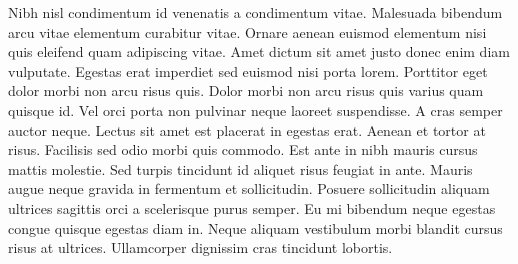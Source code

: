 \documentclass[portuguese, 11pt, a4paper, titlepage, oneside]{article}
\begin{document}
Nibh nisl condimentum id venenatis a condimentum vitae. Malesuada bibendum arcu vitae elementum curabitur vitae. Ornare aenean euismod elementum nisi quis eleifend quam adipiscing vitae. Amet dictum sit amet justo donec enim diam vulputate. Egestas erat imperdiet sed euismod nisi porta lorem. Porttitor eget dolor morbi non arcu risus quis. Dolor morbi non arcu risus quis varius quam quisque id. Vel orci porta non pulvinar neque laoreet suspendisse. A cras semper auctor neque. Lectus sit amet est placerat in egestas erat. Aenean et tortor at risus. Facilisis sed odio morbi quis commodo. Est ante in nibh mauris cursus mattis molestie. Sed turpis tincidunt id aliquet risus feugiat in ante. Mauris augue neque gravida in fermentum et sollicitudin. Posuere sollicitudin aliquam ultrices sagittis orci a scelerisque purus semper. Eu mi bibendum neque egestas congue quisque egestas diam in. Neque aliquam vestibulum morbi blandit cursus risus at ultrices. Ullamcorper dignissim cras tincidunt lobortis.
\end{document}
